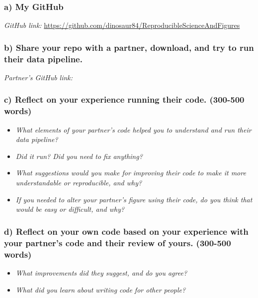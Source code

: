 \documentclass[
]{article}
\begin{document}
\subsubsection{a) My GitHub}\label{a-my-github}

\emph{GitHub link:}
\url{https://github.com/dinosaur84/ReproducibleScienceAndFigures}

\subsubsection{b) Share your repo with a partner, download, and try to
run their data
pipeline.}\label{b-share-your-repo-with-a-partner-download-and-try-to-run-their-data-pipeline.}

\emph{Partner's GitHub link:}

\subsubsection{c) Reflect on your experience running their code.
(300-500
words)}\label{c-reflect-on-your-experience-running-their-code.-300-500-words}

\begin{itemize}
\item
  \emph{What elements of your partner's code helped you to understand
  and run their data pipeline?}
\item
  \emph{Did it run? Did you need to fix anything?}
\item
  \emph{What suggestions would you make for improving their code to make
  it more understandable or reproducible, and why?}
\item
  \emph{If you needed to alter your partner's figure using their code,
  do you think that would be easy or difficult, and why?}
\end{itemize}

\subsubsection{d) Reflect on your own code based on your experience with
your partner's code and their review of yours. (300-500
words)}\label{d-reflect-on-your-own-code-based-on-your-experience-with-your-partners-code-and-their-review-of-yours.-300-500-words}

\begin{itemize}
\item
  \emph{What improvements did they suggest, and do you agree?}
\item
  \emph{What did you learn about writing code for other people?}
\end{itemize}
\end{document}
